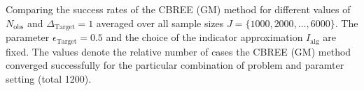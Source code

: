 Comparing the success rates of the CBREE (GM) method for different values of $N_{ \text{obs} }$  and $\Delta_{\text{Target}}=1$ averaged over all sample sizes $J =   \{1000, 2000, \ldots, 6000\}$. The parameter $\epsilon_{\text{Target}} = 0.5$ and the choice of the indicator approximation $I_\text{alg}$ are fixed. The values denote the relative number of cases the CBREE (GM) method converged successfully for the particular combination of problem and paramter setting (total 1200).